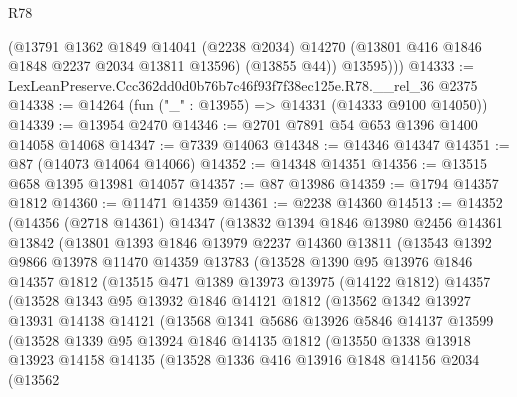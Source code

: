 \begin{lexlean}{R78}
\begin{coremodule}
          (@13791
            @1362
            @1849
            @14041
            (@2238 @2034)
            @14270
            (@13801 @416 @1846 @1848 @2237 @2034 @13811 @13596)
            (@13855 @44))
          @13595)))
@14333 := LexLeanPreserve.Ccc362dd0d0b76b7c46f93f7f38ec125e.R78.__rel_36 @2375
@14338 := @14264 (fun ("_" : @13955) => @14331 (@14333 @9100 @14050))
@14339 := @13954 @2470
@14346 := @2701 @7891 @54 @653 @1396 @1400 @14058 @14068
@14347 := @7339 @14063
@14348 := @14346 @14347
@14351 := @87 (@14073 @14064 @14066)
@14352 := @14348 @14351
@14356 := @13515 @658 @1395 @13981 @14057
@14357 := @87 @13986
@14359 := @1794 @14357 @1812
@14360 := @11471 @14359
@14361 := @2238 @14360
@14513 := @14352
    (@14356
      (@2718 @14361)
      @14347
      (@13832
        @1394
        @1846
        @13980
        @2456
        @14361
        @13842
        (@13801
          @1393
          @1846
          @13979
          @2237
          @14360
          @13811
          (@13543
            @1392
            @9866
            @13978
            @11470
            @14359
            @13783
            (@13528
              @1390
              @95
              @13976
              @1846
              @14357
              @1812
              (@13515
                @471
                @1389
                @13973
                @13975
                (@14122 @1812)
                @14357
                (@13528
                  @1343
                  @95
                  @13932
                  @1846
                  @14121
                  @1812
                  (@13562
                    @1342
                    @13927
                    @13931
                    @14138
                    @14121
                    (@13568
                      @1341
                      @5686
                      @13926
                      @5846
                      @14137
                      @13599
                      (@13528
                        @1339
                        @95
                        @13924
                        @1846
                        @14135
                        @1812
                        (@13550
                          @1338
                          @13918
                          @13923
                          @14158
                          @14135
                          (@13528
                            @1336
                            @416
                            @13916
                            @1848
                            @14156
                            @2034
                            (@13562

\end{coremodule}
\end{lexlean}

